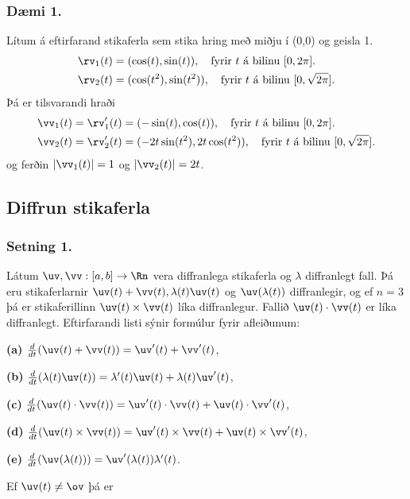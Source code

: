  \subsubsection{\nopagebreak Dæmi 1.}
Lítum á eftirfarand stikaferla sem stika hring með miðju í (0,0) og geisla 1.
 \begin{align*}
\rv_1(t) &= (\cos(t),\sin(t)), \quad \text{fyrir $t$ á bilinu $[0,2\pi].$} \\
\rv_2(t) &= (\cos(t^2),\sin(t^2)), \quad \text{fyrir $t$ á bilinu $[0,\sqrt{2\pi}].$} 
\end{align*}
Þá er tilsvarandi hraði
 \begin{align*}
\vv_1(t) = \rv_1'(t) &= (-\sin(t),\cos(t)), \quad \text{fyrir $t$ á bilinu $[0,2\pi].$} \\
\vv_2(t) = \rv_2'(t) &= (-2t\sin(t^2),2t\cos(t^2)),  \quad \text{fyrir $t$ á bilinu $[0,\sqrt{2\pi}].$}
\end{align*}
og ferðin $|\vv_1(t)| = 1$ og $|\vv_2(t)| = 2t$.
 



\subsection{Diffrun stikaferla}
\subsubsection{\nopagebreak Setning 1.}   Látum $\uv,\vv:[a,b]\rightarrow \Rn$ vera
diffranlega stikaferla og $\lambda$ diffranlegt fall.  Þá eru stikaferlarnir
$\uv(t)+\vv(t), \lambda(t)\uv(t)$ og $\uv(\lambda(t))$ diffranlegir,
og ef $n=3$ þá er stikaferillinn $\uv(t)\times \vv(t)$ líka diffranlegur.
Fallið $\uv(t)\cdot\vv(t)$ er líka diffranlegt.  Eftirfarandi listi sýnir
formúlur fyrir afleiðunum: 

{\bf (a)} $\frac{d}{dt}(\uv(t)+\vv(t))=\uv'(t)+\vv'(t)$,

{\bf (b)} $\frac{d}{dt}(\lambda(t)\uv(t))=\lambda'(t)\uv(t)+\lambda(t)\uv'(t)$,

{\bf (c)}  $\frac{d}{dt}(\uv(t)\cdot\vv(t))=\uv'(t)\cdot\vv(t)+\uv(t)\cdot\vv'(t)$,

{\bf (d)}  $\frac{d}{dt}(\uv(t)\times\vv(t))=\uv'(t)\times\vv(t)+\uv(t)\times\vv'(t)$,

{\bf (e)}  $\frac{d}{dt}(\uv(\lambda(t)))=\uv'(\lambda(t))\lambda'(t)$.

\noindent
Ef $\uv(t)\neq\ov$ þá er 

